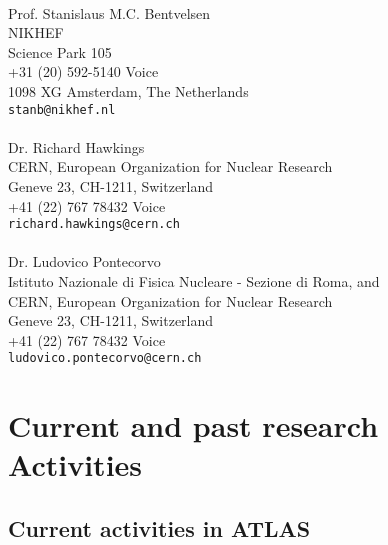 \documentclass{article}
\begin{document}
\begin{vita}
\begin{References}
  \vbox{\vspace{5mm}}           \\ 
  Prof. Stanislaus M.C. Bentvelsen  \\
  NIKHEF \\
  Science Park 105 \\
  +31 (20) 592-5140 Voice \\
  1098 XG Amsterdam,  The Netherlands \\
  {\tt stanb@nikhef.nl} \\
  \vbox{\vspace{5mm}}                             \\                                                
  Dr. Richard Hawkings \\
  CERN, European Organization for Nuclear Research \\
  Geneve 23, CH-1211, Switzerland \\
  +41 (22) 767 78432 Voice      \\
  {\tt richard.hawkings@cern.ch}       \\
  \vbox{\vspace{5mm}}           \\ 
  Dr. Ludovico Pontecorvo \\
  Istituto Nazionale di Fisica Nucleare - Sezione di Roma, and \\
  CERN, European Organization for Nuclear Research \\
  Geneve 23, CH-1211, Switzerland \\
  +41 (22) 767 78432 Voice      \\
  {\tt ludovico.pontecorvo@cern.ch}       \\
\end{References}

\section*{Current and past research Activities}
\setcounter{page}{1}
\subsection*{Current activities in ATLAS}

\end{vita}
\end{document}
